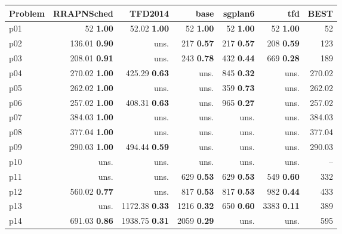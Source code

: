 \begin{tabular}{|l|rrrrr|r|}
\hline
\textbf{Problem} & \textbf{RRAPNSched} & \textbf{TFD2014} & \textbf{base} & \textbf{sgplan6} & \textbf{tfd} & \textbf{BEST}\\
\hline
p01 & {\footnotesize 52} \textbf{1.00} & {\footnotesize 52.02} \textbf{1.00} & {\footnotesize 52} \textbf{1.00} & {\footnotesize 52} \textbf{1.00} & {\footnotesize 52} \textbf{1.00} & 52\\
p02 & {\footnotesize 136.01} \textbf{0.90} & uns. & {\footnotesize 217} \textbf{0.57} & {\footnotesize 217} \textbf{0.57} & {\footnotesize 208} \textbf{0.59} & 123\\
p03 & {\footnotesize 208.01} \textbf{0.91} & uns. & {\footnotesize 243} \textbf{0.78} & {\footnotesize 432} \textbf{0.44} & {\footnotesize 669} \textbf{0.28} & 189\\
p04 & {\footnotesize 270.02} \textbf{1.00} & {\footnotesize 425.29} \textbf{0.63} & uns. & {\footnotesize 845} \textbf{0.32} & uns. & 270.02\\
p05 & {\footnotesize 262.02} \textbf{1.00} & uns. & uns. & {\footnotesize 359} \textbf{0.73} & uns. & 262.02\\
p06 & {\footnotesize 257.02} \textbf{1.00} & {\footnotesize 408.31} \textbf{0.63} & uns. & {\footnotesize 965} \textbf{0.27} & uns. & 257.02\\
p07 & {\footnotesize 384.03} \textbf{1.00} & uns. & uns. & uns. & uns. & 384.03\\
p08 & {\footnotesize 377.04} \textbf{1.00} & uns. & uns. & uns. & uns. & 377.04\\
p09 & {\footnotesize 290.03} \textbf{1.00} & {\footnotesize 494.44} \textbf{0.59} & uns. & uns. & uns. & 290.03\\
p10 & uns. & uns. & uns. & uns. & uns. & --\\
p11 & uns. & uns. & {\footnotesize 629} \textbf{0.53} & {\footnotesize 629} \textbf{0.53} & {\footnotesize 549} \textbf{0.60} & 332\\
p12 & {\footnotesize 560.02} \textbf{0.77} & uns. & {\footnotesize 817} \textbf{0.53} & {\footnotesize 817} \textbf{0.53} & {\footnotesize 982} \textbf{0.44} & 433\\
p13 & uns. & {\footnotesize 1172.38} \textbf{0.33} & {\footnotesize 1216} \textbf{0.32} & {\footnotesize 650} \textbf{0.60} & {\footnotesize 3383} \textbf{0.11} & 389\\
p14 & {\footnotesize 691.03} \textbf{0.86} & {\footnotesize 1938.75} \textbf{0.31} & {\footnotesize 2059} \textbf{0.29} & uns. & uns. & 595\\

\end{tabular}
